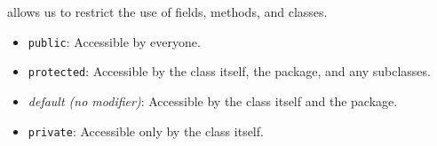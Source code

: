  allows us to restrict the use of fields, methods, and classes.

\begin{itemize}
\item \texttt{public}: Accessible by everyone.
\item \texttt{protected}: Accessible by the class itself, the package, and any subclasses.
\item \textit{default (no modifier)}: Accessible by the class itself and the package.
\item \texttt{private}: Accessible only by the class itself.
\end{itemize}